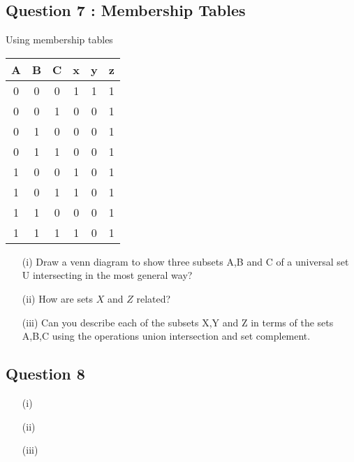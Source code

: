 {{{\subsection*{Question 7 : Membership Tables}
Using membership tables
\begin{tabular}{|ccc|c|c|c|}
	\hline
	A & B & C & x & y & z \\\hline
	0 & 0 & 0 & 1 & 1 & 1 \\
	0 & 0 & 1 & 0 & 0 & 1 \\
	0 & 1 & 0 & 0 & 0 & 1 \\
	0 & 1 & 1 & 0 & 0 & 1 \\
	1 & 0 & 0 & 1 & 0 & 1 \\
	1 & 0 & 1 & 1 & 0 & 1 \\
	1 & 1 & 0 & 0 & 0 & 1 \\
	1 & 1 & 1 & 1 & 0 & 1 \\
	\hline
\end{tabular}
\begin{itemize}
	\item[(i)] Draw a venn diagram to show three subsets A,B and C of a universal set U intersecting in
	the most general way?
	\item[(ii)] How are sets $X$ and $Z$ related?
	\item[(iii)] Can you describe each of the subsets X,Y and Z in terms  of the
	sets A,B,C using the operations union intersection and set complement.
\end{itemize}
\subsection*{Question 8}
\begin{itemize}
	
	\item[(i)] 
	
	\item[(ii)]
	
	\item[(iii)]
	
\end{itemize}





   





}}}
